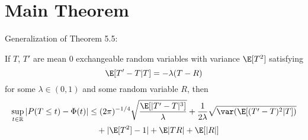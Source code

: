 \section{Main Theorem}
Generalization of Theorem 5.5:
\begin{theorem}
  \label{T:main}
  If $T$, $T'$ are mean 0 exchangeable random variables with variance $\E[T^2]$
  satisfying
  \begin{equation*}
    \label{eq:13}
    \E[T'-T|T] = -\lambda(T-R)    
  \end{equation*}
  for some $\lambda \in (0,1)$ and some random variable $R$, then 
  \begin{equation*}
    \begin{split}
      \sup_{t \in \mathbb{R}} |P(T \leq t) - \Phi(t)|
      &\leq (2\pi)^{-1/4} \sqrt{\frac{\E [|T'-T|^3]}{\lambda}}
      + \frac{1}{2\lambda} \sqrt{\var (\E [(T'-T)^2|T])} \\
      &\quad + |\E [T^2] - 1| + \E |TR| + \E [|R|]
    \end{split}
  \end{equation*}
\end{theorem}
